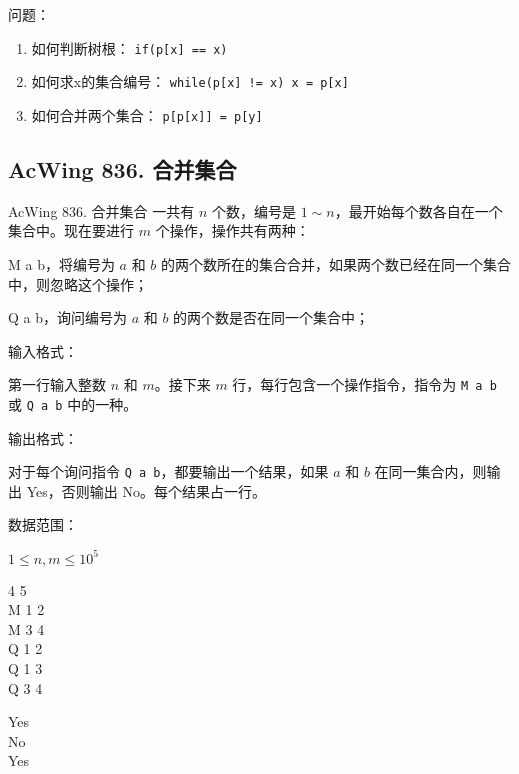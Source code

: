 问题：

\begin{enumerate}
    \item 如何判断树根： \lstinline{if(p[x] == x)}
    \item 如何求x的集合编号： \lstinline{while(p[x] != x) x = p[x]}
    \item 如何合并两个集合： \lstinline{p[p[x]] = p[y]}
\end{enumerate}

\subsection{AcWing 836. 合并集合}

\begin{titledbox}{AcWing 836. 合并集合}
一共有 $n$ 个数，编号是 $1 \sim n$，最开始每个数各自在一个集合中。现在要进行 $m$ 个操作，操作共有两种：

M a b，将编号为 $a$ 和 $b$ 的两个数所在的集合合并，如果两个数已经在同一个集合中，则忽略这个操作；

Q a b，询问编号为 $a$ 和 $b$ 的两个数是否在同一个集合中；

输入格式：

第一行输入整数 $n$ 和 $m$。接下来 $m$ 行，每行包含一个操作指令，指令为 \lstinline{M a b} 或 \lstinline{Q a b} 中的一种。

输出格式：

对于每个询问指令 \lstinline{Q a b}，都要输出一个结果，如果 $a$ 和 $b$ 在同一集合内，则输出 Yes，否则输出 No。每个结果占一行。

数据范围：

$1 \le n,m \le 10^5$
    
\begin{inputblock}
    4 5 \\
    M 1 2 \\
    M 3 4 \\
    Q 1 2 \\
    Q 1 3 \\
    Q 3 4
\end{inputblock}
\begin{outputblock}
    Yes \\
    No \\
    Yes
\end{outputblock}
\end{titledbox}

